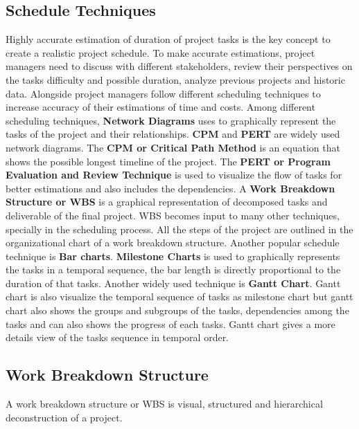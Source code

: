 \begin{spacing}{1}
\section{Schedule Techniques}
Highly accurate estimation of duration of project tasks is the key concept to create a realistic project schedule. To make accurate estimations, project managers need to discuss with different stakeholders, review their perspectives on the tasks difficulty and possible duration, analyze previous projects and historic data. Alongside project managers follow different scheduling techniques to increase accuracy of their estimations of time and costs. 
Among different scheduling techniques, \textbf{Network Diagrams} uses to graphically represent the tasks of the project and their relationships. \textbf{CPM} and \textbf{PERT} are widely used network diagrams. The \textbf{CPM or Critical Path Method} is an equation that shows the possible longest timeline of the project. The \textbf{PERT or Program Evaluation and Review Technique} is used to visualize the flow of tasks for better estimations and also includes the dependencies.
 A \textbf{Work Breakdown Structure or WBS} is a graphical representation of decomposed tasks and deliverable of the final project. WBS becomes input to many other techniques, specially in the scheduling process. All the steps of the project are outlined in the organizational chart of a work breakdown structure.
 Another popular schedule technique is \textbf{Bar charts}. \textbf{Milestone Charts} is used to graphically represents the tasks in a temporal sequence, the bar length is directly proportional to the duration of that tasks. Another widely used technique is \textbf{Gantt Chart}. Gantt chart is also visualize the temporal sequence of tasks as milestone chart but gantt chart also shows the groups and subgroups of the tasks, dependencies among the tasks and can also shows the progress of each tasks. Gantt chart gives a more details view of the tasks sequence in temporal order.
 
 \subsection{Work Breakdown Structure}
 A work breakdown structure or WBS is visual, structured and hierarchical deconstruction of a project. 
  
\end{spacing}